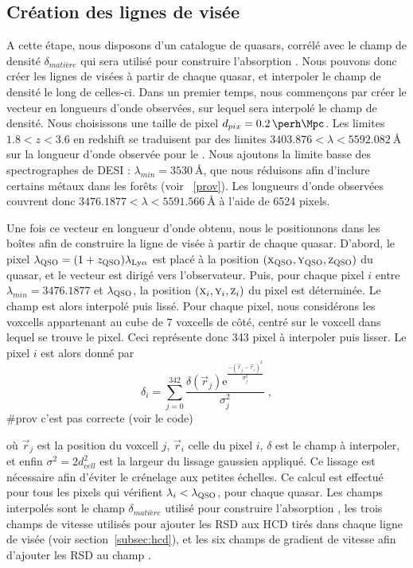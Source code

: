 \documentclass[11pt, twoside, a4paper, openright]{report}
\begin{document}
\subsection{Création des lignes de visée}
\label{subsec:los_interp}
A cette étape, nous disposons d'un catalogue de quasars, corrélé avec le champ de densité $\delta_{matière}$ qui sera utilisé pour construire l'absorption \lya{}. Nous pouvons donc créer les lignes de visées à partir de chaque quasar, et interpoler le champ de densité le long de celles-ci.
Dans un premier temps, nous commençons par créer le vecteur en longueurs d'onde observées, sur lequel sera interpolé le champ de densité. Nous choisissons une taille de pixel $d_{pix} = \SI{0.2}{\perh\Mpc}$. Les limites $\num{1.8} < z < \num{3.6}$ en redshift se traduisent par des limites $\num{3403.876} < \lambda < \SI{5592.082}{\angstrom}$ sur la longueur d'onde observée pour le \lya{}. Nous ajoutons la limite basse des spectrographes de DESI : $\lambda_{min} = \SI{3530}{\angstrom}$, que nous réduisons afin d'inclure certains métaux dans les forêts (voir ~\ref{prov}). Les longueurs d'onde observées couvrent donc $\num{3476.1877} < \lambda < \SI{5591.566}{\angstrom}$ à l'aide de \num{6524} pixels.

Une fois ce vecteur en longueur d'onde obtenu, nous le positionnons dans les boîtes afin de construire la ligne de visée à partir de chaque quasar.
D'abord, le pixel $\lambda_{\textsc{QSO}} = (1+z_{\textsc{QSO}}) \lambda_{\mathrm{Ly}\alpha}$ est placé à la position $(\textsc{x}_{\textsc{QSO}}, \textsc{y}_{\textsc{QSO}}, \textsc{z}_{\textsc{QSO}})$ du quasar, et le vecteur est dirigé vers l'observateur. Puis, pour chaque pixel $i$ entre $\lambda_{min} = \num{3476.1877}$ et $\lambda_{\textsc{QSO}}$, la position $(\textsc{x}_i, \textsc{y}_i, \textsc{z}_i)$ du pixel est déterminée.
Le champ est alors interpolé puis lissé. Pour chaque pixel, nous considérons les voxcells appartenant au cube de 7 voxcells de côté, centré sur le voxcell dans lequel se trouve le pixel. Ceci représente donc \num{343} pixel à interpoler puis lisser.
Le pixel $i$ est alors donné par
\begin{equation}
  \delta_i = \sum_{j=0}^{342}  \frac{\delta(\vec r_j) \mathrm{e}^{\frac{-(\vec r_j - \vec r_i)^2 }{ \sigma_j^2}}}{\sigma_j^2} \; ,
\end{equation}
\#prov c'est pas correcte (voir le code)

où $\vec r_j$ est la position du voxcell $j$, $\vec r_i$ celle du pixel $i$, $\delta$ est le champ à interpoler, et enfin $\sigma^2 = 2 d_{cell}^2$ est la largeur du lissage gaussien appliqué. Ce lissage est nécessaire afin d'éviter le crénelage aux petites échelles.
Ce calcul est effectué pour tous les pixels qui vérifient $\lambda_i < \lambda_{\textsc{QSO}}$, pour chaque quasar. Les champs interpolés sont le champ $\delta_{matière}$ utilisé pour construire l'absorption \lya{}, les trois champs de vitesse utilisés pour ajouter les RSD aux HCD tirés dans chaque ligne de visée (voir section~\ref{subsec:hcd}), et les six champs de gradient de vitesse afin d'ajouter les RSD au champ \lya{}.
\end{document}
